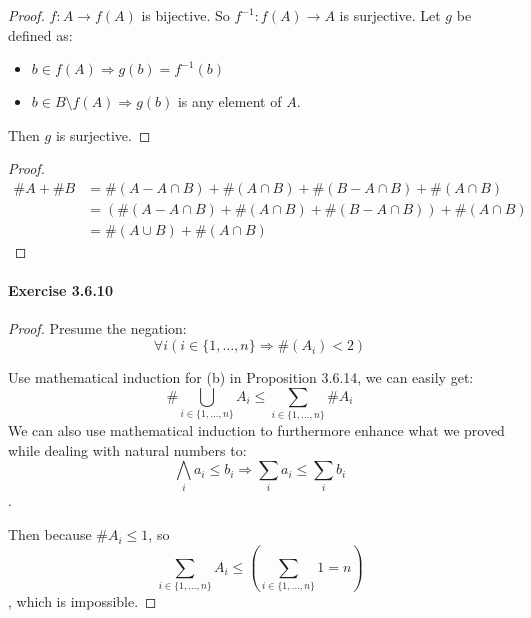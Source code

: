 \begin{proof}
$f:A \rightarrow f(A)$ is bijective. So $f^{-1}: f(A) \rightarrow A$ is surjective. Let $g$ be defined as:
\begin{itemize}
\item $b \in f(A) \Longrightarrow g(b) = f^{-1}(b)$
\item $b \in B\setminus f(A) \Longrightarrow g(b)$ is any element of $A$.
\end{itemize}

Then $g$ is surjective.
\end{proof}

\begin{proof}
\begin{align*}
\#A + \#B 
&= \#(A - A \cap B) + \#(A \cap B) + \#(B - A \cap B) + \#(A \cap B) \\
&= (\#(A - A \cap B) + \#(A \cap B) + \#(B - A \cap B)) + \#(A \cap B) \\
&= \#(A \cup B) + \#(A \cap B)
\end{align*}
\end{proof}

\paragraph{Exercise 3.6.10} \label{exercise3.6.10}
\begin{proof}
Presume the negation:
\[
\forall i(i \in \{1,\dots,n\} \Longrightarrow \#(A_i) < 2)
\]

Use mathematical induction for (b) in Proposition 3.6.14, we can easily get:
\[
\#\bigcup_{i \in \{1,\dots,n\}}A_i \leq \sum_{i \in \{1,\dots,n\}} \#A_i
\]
We can also use mathematical induction to furthermore enhance what we proved while dealing with natural 
numbers to:
\[
\bigwedge_{i} a_{i} \leq b_{i} \Longrightarrow \sum_{i} a_{i} \leq \sum_{i} b_i
\].

Then because $\# A_i \leq 1$, so 
\[
\sum_{i \in \{1,\dots,n\}} A_i \leq (\sum_{i \in \{1,\dots,n\}} 1 = n)
\], 
which is impossible.
\end{proof}